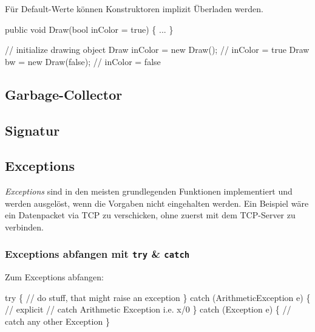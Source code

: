 \documentclass[
  9pt,
  a4paperpaper,
  DIV=11]{scrartcl}
\newenvironment{Shaded}{}{}
\newcommand{\CommentTok}[1]{\textcolor[rgb]{0.42,0.45,0.49}{#1}}
\newcommand{\DataTypeTok}[1]{\textcolor[rgb]{0.84,0.23,0.29}{#1}}
\newcommand{\FunctionTok}[1]{\textcolor[rgb]{0.44,0.26,0.76}{#1}}
\newcommand{\KeywordTok}[1]{\textcolor[rgb]{0.84,0.23,0.29}{#1}}
\newcommand{\NormalTok}[1]{\textcolor[rgb]{0.14,0.16,0.18}{#1}}
\newcommand{\OperatorTok}[1]{\textcolor[rgb]{0.14,0.16,0.18}{#1}}
\numberwithin{equation}{section}
\begin{document}
\begin{multicols}{2}
Für Default-Werte können Konstruktoren implizit Überladen werden.

\begin{Shaded}
\begin{Highlighting}[]
\KeywordTok{public} \DataTypeTok{void} \FunctionTok{Draw}\OperatorTok{(}\DataTypeTok{bool}\NormalTok{ inColor }\OperatorTok{=} \KeywordTok{true}\OperatorTok{)} \OperatorTok{\{} \OperatorTok{...} \OperatorTok{\}}

\CommentTok{// initialize drawing object}
\NormalTok{Draw inColor }\OperatorTok{=} \KeywordTok{new} \FunctionTok{Draw}\OperatorTok{();}    \CommentTok{// inColor = true}
\NormalTok{Draw bw }\OperatorTok{=} \KeywordTok{new} \FunctionTok{Draw}\OperatorTok{(}\KeywordTok{false}\OperatorTok{);}    \CommentTok{// inColor = false}
\end{Highlighting}
\end{Shaded}

\hypertarget{garbage-collector}{%
\subsection{Garbage-Collector}\label{garbage-collector}}

\hypertarget{signatur}{%
\subsection{Signatur}\label{signatur}}

\hypertarget{exceptions}{%
\subsection{Exceptions}\label{exceptions}}

\emph{Exceptions} sind in den meisten grundlegenden Funktionen
implementiert und werden ausgelöst, wenn die Vorgaben nicht eingehalten
werden. Ein Beispiel wäre ein Datenpacket via TCP zu verschicken, ohne
zuerst mit dem TCP-Server zu verbinden.

\hypertarget{exceptions-abfangen-mit-try-catch}{%
\subsubsection{\texorpdfstring{Exceptions abfangen mit \texttt{try} \&
\texttt{catch}}{Exceptions abfangen mit try \& catch}}\label{exceptions-abfangen-mit-try-catch}}

Zum Exceptions abfangen:

\begin{Shaded}
\begin{Highlighting}[]
\KeywordTok{try} \OperatorTok{\{}
  \CommentTok{// do stuff, that might raise an exception}
\OperatorTok{\}}
\KeywordTok{catch} \OperatorTok{(}\NormalTok{ArithmeticException e}\OperatorTok{)} \OperatorTok{\{} \CommentTok{// explicit}
  \CommentTok{// catch Arithmetic Exception i.e. x/0}
\OperatorTok{\}}
\KeywordTok{catch} \OperatorTok{(}\NormalTok{Exception e}\OperatorTok{)} \OperatorTok{\{}
  \CommentTok{// catch any other Exception}
\OperatorTok{\}}
\end{Highlighting}
\end{Shaded}


\end{multicols}
\end{document}
